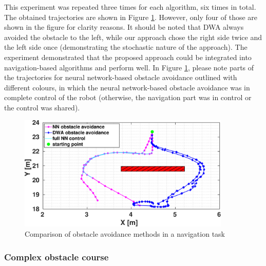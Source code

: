 This experiment was repeated three times for each algorithm, six times in total. The obtained trajectories are shown in Figure \ref{fig:Fig11}. However, only four of those are shown in the figure for clarity reasons. It should be noted that DWA always avoided the obstacle to the left, while our approach chose the right side twice and the left side once (demonstrating the stochastic nature of the approach). The experiment demonstrated that the proposed approach could be integrated into navigation-based algorithms and perform well. In Figure \ref{fig:Fig11}, please note parts of the trajectories for neural network-based obstacle avoidance outlined with different colours, in which the neural network-based obstacle avoidance was in complete control of the robot (otherwise, the navigation part was in control or the control was shared).

\begin{figure}
    \centering
    \includegraphics[width=0.9\textwidth]{slike/turkish/Fig11.pdf}
    \caption{Comparison of obstacle avoidance methods in a navigation task}
    \label{fig:Fig11}
\end{figure}

\subsubsection{Complex obstacle course}

